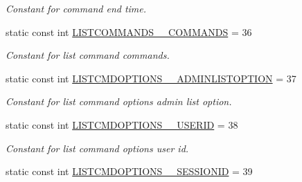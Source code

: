 \begin{DoxyCompactItemize}
\begin{DoxyCompactList}\small\item\em Constant for command end time. \item\end{DoxyCompactList}\item 
\hypertarget{classUMS__Data_1_1UMS__DataPackage_a284049156b3ebc76a697005e30d70340}{
static const int \hyperlink{classUMS__Data_1_1UMS__DataPackage_a284049156b3ebc76a697005e30d70340}{LISTCOMMANDS\_\-\_\-COMMANDS} = 36}
\label{classUMS__Data_1_1UMS__DataPackage_a284049156b3ebc76a697005e30d70340}

\begin{DoxyCompactList}\small\item\em Constant for list command commands. \item\end{DoxyCompactList}\item 
\hypertarget{classUMS__Data_1_1UMS__DataPackage_a5c43cdc8af5c4dcba493a110a3f1259d}{
static const int \hyperlink{classUMS__Data_1_1UMS__DataPackage_a5c43cdc8af5c4dcba493a110a3f1259d}{LISTCMDOPTIONS\_\-\_\-ADMINLISTOPTION} = 37}
\label{classUMS__Data_1_1UMS__DataPackage_a5c43cdc8af5c4dcba493a110a3f1259d}

\begin{DoxyCompactList}\small\item\em Constant for list command options admin list option. \item\end{DoxyCompactList}\item 
\hypertarget{classUMS__Data_1_1UMS__DataPackage_ae54a1479f452a43d3cb44c1cd236e9d0}{
static const int \hyperlink{classUMS__Data_1_1UMS__DataPackage_ae54a1479f452a43d3cb44c1cd236e9d0}{LISTCMDOPTIONS\_\-\_\-USERID} = 38}
\label{classUMS__Data_1_1UMS__DataPackage_ae54a1479f452a43d3cb44c1cd236e9d0}

\begin{DoxyCompactList}\small\item\em Constant for list command options user id. \item\end{DoxyCompactList}\item 
\hypertarget{classUMS__Data_1_1UMS__DataPackage_a2d82201bb26cd646cea7b5284a9ce6c8}{
static const int \hyperlink{classUMS__Data_1_1UMS__DataPackage_a2d82201bb26cd646cea7b5284a9ce6c8}{LISTCMDOPTIONS\_\-\_\-SESSIONID} = 39}
\label{classUMS__Data_1_1UMS__DataPackage_a2d82201bb26cd646cea7b5284a9ce6c8}


\end{DoxyCompactItemize}
